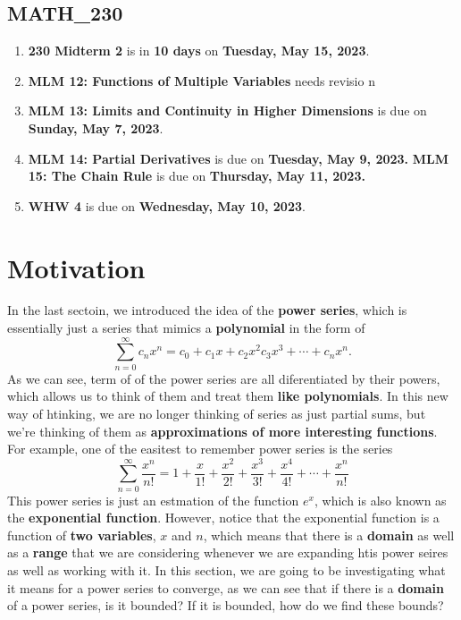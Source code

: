 \subsection{MATH\_230}
\begin{enumerate}
  \item \textbf{230 Midterm 2} is in \textbf{10 days} on
        \textbf{Tuesday, May 15, 2023}.
  \item \textbf{MLM 12: Functions of Multiple Variables} needs revisio n
  \item \textbf{MLM 13: Limits and Continuity in Higher
        Dimensions} is due on \textbf{Sunday, May 7, 2023}.
  \item \textbf{MLM 14: Partial Derivatives} is due on
        \textbf{Tuesday, May 9, 2023.}
        \textbf \textbf{MLM 15: The Chain Rule} is due on
        \textbf{Thursday, May 11, 2023.}
  \item \textbf{WHW 4} is due on \textbf{Wednesday,
        May 10, 2023}.

\end{enumerate}

\section{Motivation}
In the last sectoin, we introduced the idea of the \textbf{power series},
which is essentially just a series that mimics
a \textbf{polynomial} in the form of
\[ \sum_{n=0}^{\infty} c_{n}x^{n} = c_{0} +
c_{1}x + c_{2}x^{2} c_{3}x^{3} + \cdots + c_{n}x^{n}. \]
As we can see, term of of the power series are all
diferentiated by their powers, which allows us to think
of them and treat them \textbf{like polynomials}. In
this new way of htinking, we are no longer thinking of series
as just partial sums, but we're thinking of them as
\textbf{approximations of more interesting functions}.
For example, one of the easitest to remember power series
is the series
\[ \sum_{n=0}^{\infty} \frac{x^{n}}{n!} = 1 + \frac{x}{1!} + \frac{x^{2}}{2!} + \frac{x^{3}}{3!} + \frac{x^{4}}{4!} +
  \cdots + \frac{x^{n}}{n!}\]
This power series is just an estmation of the function
$ e^{x} $, which is also known as the \textbf{exponential
  function}. However, notice that the exponential function
is a function of \textbf{two variables}, $ x $ and $ n $, which
means that there is a \textbf{domain} as well as a \textbf{range} that we are considering whenever we are expanding htis
power seires as well as working with it. In this section,
we are going to be investigating what it means for a
power series to converge, as we can see that if there
is a \textbf{domain} of a power series, is it bounded? If it
is bounded, how do we find these bounds?
